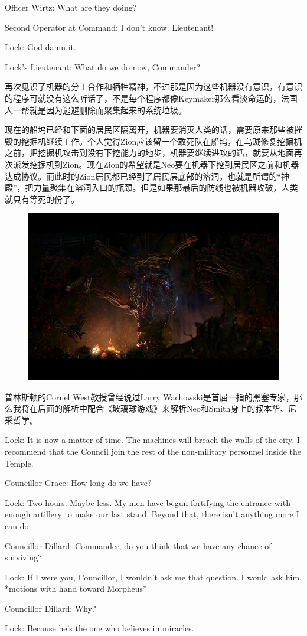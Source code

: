 \documentclass[UTF8]{ctexart}
\newenvironment{myquote}{\color{green} \setlength{\leftskip}{6em} \setlength{\rightskip}{4em} \setlength{\parindent}{-2em}}{\par}
\begin{document}
\begin{myquote}
Officer Wirtz: What are they doing?

Second Operator at Command: I don't know. Lieutenant!

Lock: God damn it.

Lock's Lieutenant: What do we do now, Commander?
\end{myquote}

再次见识了机器的分工合作和牺牲精神，不过那是因为这些机器没有意识，有意识的程序可就没有这么听话了，不是每个程序都像Keymaker那么看淡命运的，法国人一帮就是因为逃避删除而聚集起来的系统垃圾。

现在的船坞已经和下面的居民区隔离开，机器要消灭人类的话，需要原来那些被摧毁的挖掘机继续工作。个人觉得Zion应该留一个敢死队在船坞，在乌贼修复挖掘机之前，把挖掘机攻击到没有下挖能力的地步，机器要继续进攻的话，就要从地面再次派发挖掘机到Zion。现在Zion的希望就是Neo要在机器下挖到居民区之前和机器达成协议。而此时的Zion居民都已经到了居民层底部的溶洞，也就是所谓的“神殿”，把力量聚集在溶洞入口的瓶颈。但是如果那最后的防线也被机器攻破，人类就只有等死的份了。

\begin{figure}[htb]
\centering
\includegraphics[width=0.5\linewidth]{fig/0c47bd3143d3c4a85fdf0e72.jpg}
\end{figure}

普林斯顿的Cornel West教授曾经说过Larry Wachowski是首屈一指的黑塞专家，那么我将在后面的解析中配合《玻璃球游戏》来解析Neo和Smith身上的叔本华、尼采哲学。

\begin{myquote}
Lock: It is now a matter of time. The machines will breach the walls of the city. I recommend that the Council join the rest of the non-military personnel inside the Temple.

Councillor Grace: How long do we have?

Lock: Two hours. Maybe less. My men have begun fortifying the entrance with enough artillery to make our last stand. Beyond that, there isn't anything more I can do.

Councillor Dillard: Commander, do you think that we have any chance of surviving?

Lock: If I were you, Councillor, I wouldn't ask me that question. I would ask him. *motions with hand toward Morpheus*

Councillor Dillard: Why?

Lock: Because he's the one who believes in miracles.
\end{myquote}
\end{document}
